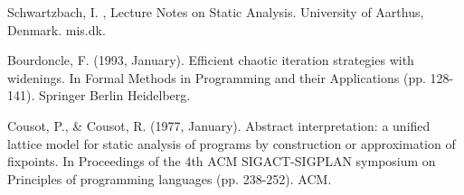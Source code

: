 \documentclass{article}
\begin{document}

\begin{thebibliography}{XXX}
   Schwartzbach, I. , Lecture Notes on Static Analysis. University of Aarthus, Denmark. mis\@bricks.dk.

   Bourdoncle, F. (1993, January). Efficient chaotic iteration strategies with widenings. In Formal Methods in Programming and their Applications (pp. 128-141). Springer Berlin Heidelberg.

   Cousot, P., \& Cousot, R. (1977, January). Abstract interpretation: a unified lattice model for static analysis of programs by construction or approximation of fixpoints. In Proceedings of the 4th ACM SIGACT-SIGPLAN symposium on Principles of programming languages (pp. 238-252). ACM.

\end{thebibliography}
\end{document}
